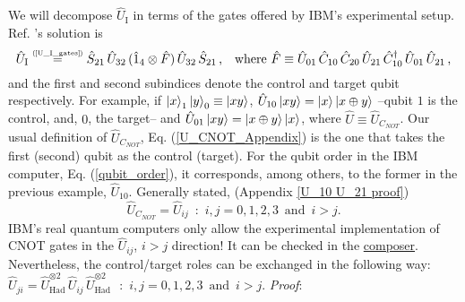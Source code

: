 \documentclass[11pt]{article}
\numberwithin{equation}{section} %
\numberwithin{figure}{section} %
\newcommand\numeq[1] %
  {\stackrel{\scriptscriptstyle(\mkern-1.5mu#1\mkern-1.5mu)}{=}}
\begin{document}
We will decompose $\hat{U}_{\textrm{I}}$ in terms of the gates offered by IBM's experimental setup. Ref. \cite{QAL_IBM}'s solution is 
\begin{equation} \label{interaction_operator}
\hat{U}_{\textrm{I}}\numeq{\textrm{\ref{U_I_gates}}}\hat{S}_{21}\,\hat{U}_{32}\,(\hat{1}_4\otimes\hat{F})\,\hat{U}_{32}\,\hat{S}_{21}\,\textrm{,}\quad\textrm{where}\,\, \hat{F}\equiv \hat{U}_{01}\,\hat{C}_{10}\,\hat{C}_{20}\,\hat{U}_{21}\,\hat{C}_{10}^\dagger\,\hat{U}_{01}\,\hat{U}_{21}\,\textrm{,}
\end{equation}
and the first and second subindices denote the control and target qubit respectively. For example, if $\ket{x}_1\ket{y}_0\equiv\ket{xy}$, $\hat{U}_{10}\ket{xy}=\ket{x}\ket{x\oplus y}$ --qubit $1$ is the control, and, $0$, the target-- and $\hat{U}_{01}\ket{xy}=\ket{x\oplus y}\ket{x}$, where $\hat{U}\equiv\hat{U}_{C_{NOT}}$. Our usual definition of  $\hat{U}_{C_{NOT}}$, Eq. (\ref{U_CNOT_Appendix}) is the one that takes the first (second) qubit as the control (target). For the qubit order in the IBM computer, Eq. (\ref{qubit_order}), it corresponds, among others, to the former in the previous example, $\hat{U}_{10}$. Generally stated, (Appendix \ref{U_10 U_21 proof})
\begin{equation} \label{U_10 U_21}
 \hat{U}_{C_{NOT}}=\hat{U}_{ij}\,\textrm{ : } \,i,j=0,1,2,3\,\,\,\textrm{and}\,\,\,i>j\textrm{.}
\end{equation} 
IBM's real quantum computers only allow the experimental implementation of CNOT gates in the $\hat{U}_{ij}$, $i>j$ direction! It can be checked in the \href{https://quantumexperience.ng.bluemix.net/qx/editor}{composer}. Nevertheless, the control/target roles can be exchanged in the following way: $\hat{U}_{ji}=\hat{U}_{\textrm{Had}}^{\otimes 2}\,\hat{U}_{ij}\,\hat{U}_{\textrm{Had}}^{\otimes 2}$ $\textrm{ : } \,i,j=0,1,2,3\,\,\,\textrm{and}\,\,\,i>j\textrm{.}$ \emph{Proof}:
\end{document}
